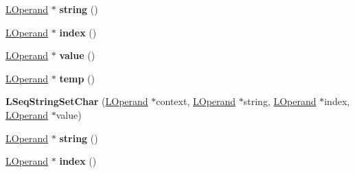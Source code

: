 \begin{DoxyCompactItemize}
\item 
\hyperlink{classv8_1_1internal_1_1_l_operand}{L\+Operand} $\ast$ {\bfseries string} ()\hypertarget{classv8_1_1internal_1_1_l_seq_string_set_char_a1fcee06e873470500f85a41f75bd0faa}{}\label{classv8_1_1internal_1_1_l_seq_string_set_char_a1fcee06e873470500f85a41f75bd0faa}

\item 
\hyperlink{classv8_1_1internal_1_1_l_operand}{L\+Operand} $\ast$ {\bfseries index} ()\hypertarget{classv8_1_1internal_1_1_l_seq_string_set_char_ab3e762192555a55b62a9b438635a1178}{}\label{classv8_1_1internal_1_1_l_seq_string_set_char_ab3e762192555a55b62a9b438635a1178}

\item 
\hyperlink{classv8_1_1internal_1_1_l_operand}{L\+Operand} $\ast$ {\bfseries value} ()\hypertarget{classv8_1_1internal_1_1_l_seq_string_set_char_aeb1a6ce9adf8943da9ec22afe2b5af72}{}\label{classv8_1_1internal_1_1_l_seq_string_set_char_aeb1a6ce9adf8943da9ec22afe2b5af72}

\item 
\hyperlink{classv8_1_1internal_1_1_l_operand}{L\+Operand} $\ast$ {\bfseries temp} ()\hypertarget{classv8_1_1internal_1_1_l_seq_string_set_char_af5230b5da005185d88b6c40e43cff7f3}{}\label{classv8_1_1internal_1_1_l_seq_string_set_char_af5230b5da005185d88b6c40e43cff7f3}

\item 
{\bfseries L\+Seq\+String\+Set\+Char} (\hyperlink{classv8_1_1internal_1_1_l_operand}{L\+Operand} $\ast$context, \hyperlink{classv8_1_1internal_1_1_l_operand}{L\+Operand} $\ast$string, \hyperlink{classv8_1_1internal_1_1_l_operand}{L\+Operand} $\ast$index, \hyperlink{classv8_1_1internal_1_1_l_operand}{L\+Operand} $\ast$value)\hypertarget{classv8_1_1internal_1_1_l_seq_string_set_char_a719cac196a8e6c740c4055635b87f496}{}\label{classv8_1_1internal_1_1_l_seq_string_set_char_a719cac196a8e6c740c4055635b87f496}

\item 
\hyperlink{classv8_1_1internal_1_1_l_operand}{L\+Operand} $\ast$ {\bfseries string} ()\hypertarget{classv8_1_1internal_1_1_l_seq_string_set_char_a1fcee06e873470500f85a41f75bd0faa}{}\label{classv8_1_1internal_1_1_l_seq_string_set_char_a1fcee06e873470500f85a41f75bd0faa}

\item 
\hyperlink{classv8_1_1internal_1_1_l_operand}{L\+Operand} $\ast$ {\bfseries index} ()\hypertarget{classv8_1_1internal_1_1_l_seq_string_set_char_ab3e762192555a55b62a9b438635a1178}{}\label{classv8_1_1internal_1_1_l_seq_string_set_char_ab3e762192555a55b62a9b438635a1178}


\end{DoxyCompactItemize}
